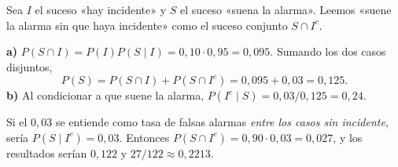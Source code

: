 Sea $I$ el suceso «hay incidente» y $S$ el suceso «suena la alarma». Leemos «suene la alarma sin que haya incidente» como el suceso conjunto $S\cap I^c$.

\textbf{a)} $P(S\cap I)=P(I)P(S\mid I)=0{,}10\cdot0{,}95=0{,}095$. Sumando los dos casos disjuntos,
\[
P(S)=P(S\cap I)+P(S\cap I^c)=0{,}095+0{,}03=\boxed{0{,}125}.
\]
\textbf{b)} Al condicionar a que suene la alarma, $P(I^c\mid S)=0{,}03/0{,}125=\boxed{0{,}24}$.

Si el $0{,}03$ se entiende como tasa de falsas alarmas \emph{entre los casos sin incidente}, sería $P(S\mid I^c)=0{,}03$. Entonces $P(S\cap I^c)=0{,}90\cdot0{,}03=0{,}027$, y los resultados serían $0{,}122$ y $27/122\approx0{,}2213$.
